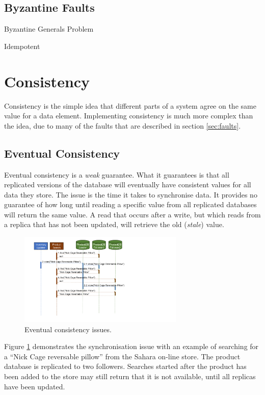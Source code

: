 \subsection{Byzantine Faults}
Byzantine Generals Problem

Idempotent

\section{Consistency}
Consistency is the simple idea that different parts of a system agree on the same value for a data element.
Implementing consistency is much more complex than the idea, due to many of the faults that are described in section \ref{sec:faults}.

\subsection{Eventual Consistency}

Eventual consistency is a \emph{weak} guarantee.
What it guarantees is that all replicated versions of the database will eventually have consistent values for all data they store.
The issue is the time it takes to synchronise data.
It provides no guarantee of how long until reading a specific value from all replicated databases will return the same value.
A read that occurs after a write, but which reads from a replica that has not been updated, will retrieve the old (\emph{stale}) value.

\begin{figure}[h!]
    \centering
    \includegraphics[trim=60 152 330 18,clip,width=0.7\textwidth]{diagrams/eventual-consistency-seq.png}
    \caption{Eventual consistency issues.}
    \label{fig:eventual-consistency-seq}
\end{figure}

Figure \ref{fig:eventual-consistency-seq} demonstrates the synchronisation issue
with an example of searching for a ``Nick Cage reversable pillow'' from the Sahara on-line store.
The product database is replicated to two followers.
Searches started after the product has been added to the store may still return that it is not available,
until all replicas have been updated.


